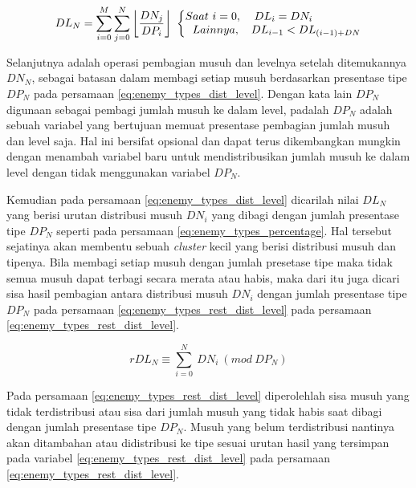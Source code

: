 \begin{equation}\label{eq:enemy_types_dist_level}
\begin{split}
	DL_{N} = \sum_{i = 0}^{M} \sum_{j = 0}^{N} \left \lfloor \frac{DN_{j}}{DP_{i}} \right \rfloor\
	\left\{\begin{matrix} 
	Saat\ i = 0, & \hspace{-4.0em}DL_{i} = DN_{i} \\ 
	\hspace{0.5em} Lainnya, & DL_{i - 1} < DL_{(i - 1) + DN}
	\end{matrix}\right.
\end{split}
\end{equation}

Selanjutnya adalah operasi pembagian musuh dan levelnya setelah ditemukannya $DN_{N}$, sebagai batasan dalam membagi setiap musuh berdasarkan presentase tipe $DP_{N}$ pada persamaan \ref{eq:enemy_types_dist_level}. Dengan kata lain $DP_{N}$ digunaan sebagai pembagi jumlah musuh ke dalam level, padalah $DP_{N}$ adalah sebuah variabel yang bertujuan memuat presentase pembagian jumlah musuh dan level saja. Hal ini bersifat opsional dan dapat terus dikembangkan mungkin dengan menambah variabel baru untuk mendistribusikan jumlah musuh ke dalam level dengan tidak menggunakan variabel $DP_{N}$.
\vspace{1ex}

Kemudian pada persamaan \ref{eq:enemy_types_dist_level} dicarilah nilai $DL_{N}$ yang berisi urutan distribusi musuh $DN_{i}$ yang dibagi dengan jumlah presentase tipe $DP_{N}$ seperti pada persamaan \ref{eq:enemy_types_percentage}. Hal tersebut sejatinya akan membentu sebuah \textit{cluster} kecil yang berisi distribusi musuh dan tipenya. Bila membagi setiap musuh dengan jumlah presetase tipe maka tidak semua musuh dapat terbagi secara merata atau habis, maka dari itu juga dicari sisa hasil pembagian antara distribusi musuh $DN_{i}$ dengan jumlah presentase tipe $DP_{N}$ pada persamaan \ref{eq:enemy_types_rest_dist_level} pada persamaan \ref{eq:enemy_types_rest_dist_level}.
\vspace{1ex}

\begin{equation}\label{eq:enemy_types_rest_dist_level}
rDL_{N} \equiv \sum_{i = 0}^{N}\ DN_{i}\ (mod\ DP_{N})
\end{equation}

Pada persamaan \ref{eq:enemy_types_rest_dist_level} diperolehlah sisa musuh yang tidak terdistribusi atau sisa dari jumlah musuh yang tidak habis saat dibagi dengan jumlah presentase tipe $DP_{N}$. Musuh yang belum terdistribusi nantinya akan ditambahan atau didistribusi ke tipe sesuai urutan hasil yang tersimpan pada variabel \ref{eq:enemy_types_rest_dist_level} pada persamaan \ref{eq:enemy_types_rest_dist_level}.


